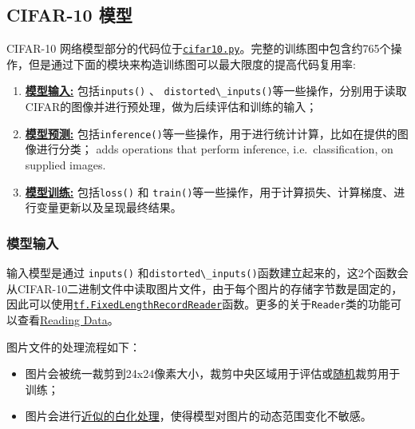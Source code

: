 \subsection{CIFAR-10 模型 }\label{cifar-10-ux6a21ux578b}

CIFAR-10 网络模型部分的代码位于\href{https://tensorflow.googlesource.com/tensorflow/+/master/tensorflow/models/image/cifar10/cifar10.py}{\lstinline{cifar10.py}}。完整的训练图中包含约765个操作，但是通过下面的模块来构造训练图可以最大限度的提高代码复用率:

\begin{enumerate}
\def\labelenumi{\arabic{enumi}.}
\tightlist
\item
  \protect\hyperlink{model-inputs}{\textbf{模型输入:}}
  包括\lstinline{inputs()} 、
  \lstinline{distorted\_inputs()}等一些操作，分别用于读取CIFAR的图像并进行预处理，做为后续评估和训练的输入；
\item
  \protect\hyperlink{model-prediction}{\textbf{模型预测:}}
  包括\lstinline{inference()}等一些操作，用于进行统计计算，比如在提供的图像进行分类；
  adds operations that perform inference, i.e.~classification, on
  supplied images.
\item
  \protect\hyperlink{model-training}{\textbf{模型训练:}}
  包括\lstinline{loss()} 和
  \lstinline{train()}等一些操作，用于计算损失、计算梯度、进行变量更新以及呈现最终结果。
\end{enumerate}

\subsubsection{模型输入 }\label{ux6a21ux578bux8f93ux5165}

输入模型是通过 \lstinline{inputs()}
和\lstinline{distorted\_inputs()}函数建立起来的，这2个函数会从CIFAR-10二进制文件中读取图片文件，由于每个图片的存储字节数是固定的，因此可以使用\href{https://github.com/jikexueyuanwiki/tensorflow-zh/blob/master/SOURCE/api_docs/python/io_ops.md\#FixedLengthRecordReader}{\lstinline{tf.FixedLengthRecordReader}}函数。更多的关于\lstinline{Reader}类的功能可以查看\href{https://github.com/jikexueyuanwiki/tensorflow-zh/blob/master/SOURCE/how_tos/reading_data/index.md\#reading-from-files}{Reading
Data}。

图片文件的处理流程如下：

\begin{itemize}
\tightlist
\item
  图片会被统一裁剪到24x24像素大小，裁剪中央区域用于评估或\href{https://github.com/jikexueyuanwiki/tensorflow-zh/blob/master/SOURCE/api_docs/python/image.md\#random_crop}{随机}裁剪用于训练；
\item
  图片会进行\href{https://github.com/jikexueyuanwiki/tensorflow-zh/blob/master/SOURCE/api_docs/python/image.md\#per_image_whitening}{近似的白化处理}，使得模型对图片的动态范围变化不敏感。
\end{itemize}

